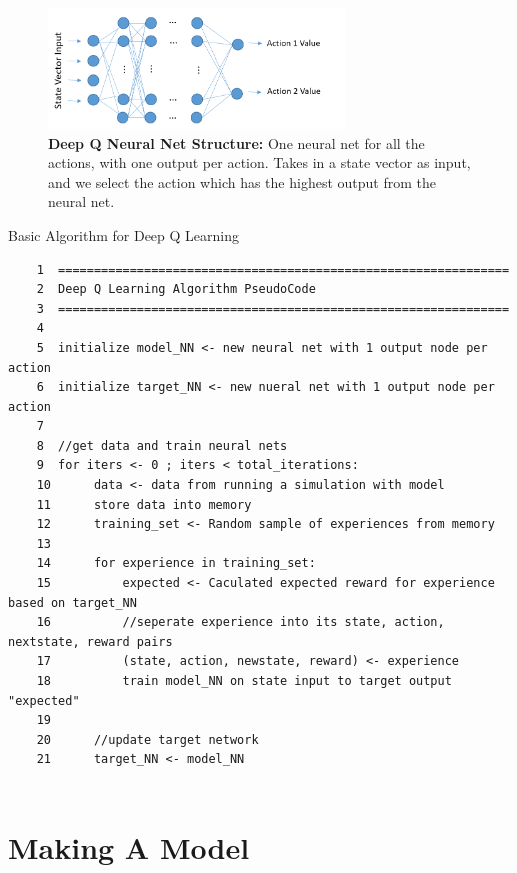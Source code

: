 \documentclass[onecolumn,letterpaper,11pt]{article}
\begin{document}
\begin{figure}[H]
	\centering 
	\includegraphics[width=0.7\textwidth]{../images/deepQNet.png}
	\caption{{\bf Deep Q Neural Net Structure:} One neural net for all the actions, with one output per action. Takes in a state vector as input, and we select the action which has the highest output from the neural net.}
	\label{fig_deep_q_net}
\end{figure}

\vspace{0.15in}
\begin{listing}{Basic Algorithm for Deep Q Learning}
	\label{lst_uSpeechRec_econfig}
	\footnotesize
	\begin{verbatim}
	1  =============================================================== 
	2  Deep Q Learning Algorithm PseudoCode                   
	3  =============================================================== 
	4                                                                  
	5  initialize model_NN <- new neural net with 1 output node per action
	6  initialize target_NN <- new nueral net with 1 output node per action
	7	
	8  //get data and train neural nets
	9  for iters <- 0 ; iters < total_iterations:
	10      data <- data from running a simulation with model 
	11      store data into memory
	12      training_set <- Random sample of experiences from memory
	13
	14      for experience in training_set: 
	15          expected <- Caculated expected reward for experience based on target_NN
	16          //seperate experience into its state, action, nextstate, reward pairs
	17          (state, action, newstate, reward) <- experience
	18          train model_NN on state input to target output "expected"
	19 
	20      //update target network
	21      target_NN <- model_NN   
	                                                     
	\end{verbatim}
	\normalsize
\end{listing}


\section{Making A Model}
\end{document}
